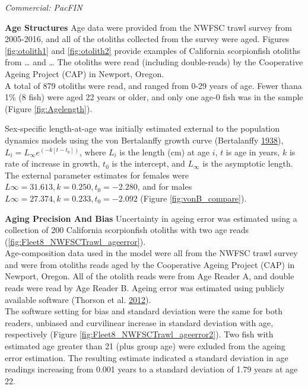 \documentclass[12pt,]{article}
\begin{document}
\emph{Commercial: PacFIN}

\vspace{.5cm}

\textbf{Age Structures} Age data were provided from the NWFSC trawl
survey from 2005-2016, and all of the otoliths collected from the survey
were aged. Figures \ref{fig:otolith1} and \ref{fig:otolith2} provide
examples of California scorpionfish otoliths from \ldots{} and \ldots{}
The otoliths were read (including double-reads) by the Cooperative
Ageing Project (CAP) in Newport, Oregon.\\
A total of 879 otoliths were read, and ranged from 0-29 years of age.
Fewer thana 1\% (8 fish) were aged 22 years or older, and only one age-0
fish was in the sample (Figure \ref{fig:Agelength}).

Sex-specific length-at-age was initially estimated external to the
population dynamics models using the von Bertalanffy growth curve
(Bertalanffy \protect\hyperlink{ref-vonB1938}{1938}),
\(L_i = L_{\infty}e^{(-k[t-t_0])}\), where \(L_i\) is the length (cm) at
age \(i\), \(t\) is age in years, \(k\) is rate of increase in growth,
\(t_0\) is the intercept, and \(L_{\infty}\) is the asymptotic length.\\
The external parameter estimates for females were
\(L{\infty}=31.613, k = 0.250, t_0 = -2.280\), and for males
\(L{\infty}=27.374, k = 0.233, t_0 = -2.092\) (Figure
\ref{fig:vonB_compare}).

\vspace{.5cm}

\textbf{Aging Precision And Bias} Uncertainty in ageing error was
estimated using a collection of 200 California scorpionfish otoliths
with two age reads (\ref{fig:Fleet8_NWFSCTrawl_ageerror}).\\
Age-composition data used in the model were all from the NWFSC trawl
survey and were from otoliths reads aged by the Cooperative Ageing
Project (CAP) in Newport, Oregon. All of the otolith reads were from Age
Reader A, and double reads were read by Age Reader B. Ageing error was
estimated using publicly available software (Thorson et al.
\protect\hyperlink{ref-Thorson2012}{2012}).\\
The software setting for bias and standard deviation were the same for
both readers, unbiased and curvilinear increase in standard deviation
with age, respectively (Figure \ref{fig:Fleet8_NWFSCTrawl_ageerror2}).
Two fish with estimated age greater than 21 (plus group age) were
exluded from the ageing error estimation. The resulting estimate
indicated a standard deviation in age readings increasing from 0.001
years to a standard deviation of 1.79 years at age 22.
\end{document}
